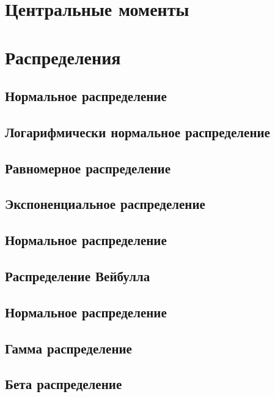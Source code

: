 \documentclass[]{scrartcl}
\begin{document}
\section{Центральные моменты}\label{moments}

\section{Распределения}

\subsection{Нормальное распределение}

\subsection{Логарифмически нормальное распределение}

\subsection{Равномерное распределение}

\subsection{Экспоненциальное распределение}

\subsection{Нормальное распределение}

\subsection{Распределение Вейбулла}

\subsection{Нормальное распределение}

\subsection{Гамма распределение}

\subsection{Бета распределение}
\end{document}
